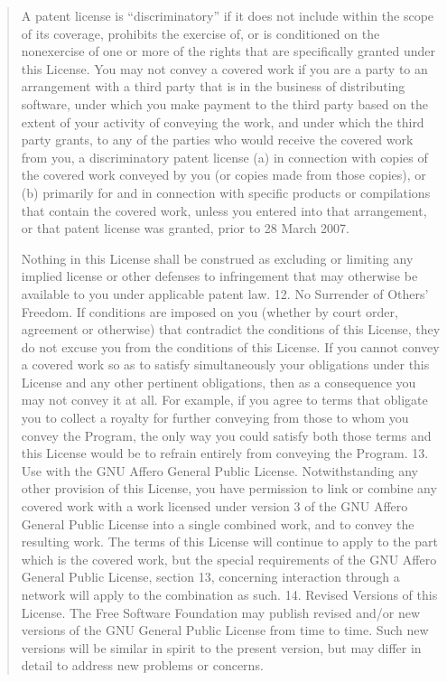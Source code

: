 \documentclass[letterpaper,10pt,english]{sphinxmanual}
\begin{document}
\begin{quote}
A patent license is “discriminatory” if it does not include within the scope of its coverage, prohibits the exercise of, or is conditioned on the non\sphinxhyphen{}exercise of one or more of the rights that are specifically granted under this License. You may not convey a covered work if you are a party to an arrangement with a third party that is in the business of distributing software, under which you make payment to the third party based on the extent of your activity of conveying the work, and under which the third party grants, to any of the parties who would receive the covered work from you, a discriminatory patent license (a) in connection with copies of the covered work conveyed by you (or copies made from those copies), or (b) primarily for and in connection with specific products or compilations that contain the covered work, unless you entered into that arrangement, or that patent license was granted, prior to 28 March 2007.

Nothing in this License shall be construed as excluding or limiting any implied license or other defenses to infringement that may otherwise be available to you under applicable patent law.
12. No Surrender of Others’ Freedom.
If conditions are imposed on you (whether by court order, agreement or otherwise) that contradict the conditions of this License, they do not excuse you from the conditions of this License. If you cannot convey a covered work so as to satisfy simultaneously your obligations under this License and any other pertinent obligations, then as a consequence you may not convey it at all. For example, if you agree to terms that obligate you to collect a royalty for further conveying from those to whom you convey the Program, the only way you could satisfy both those terms and this License would be to refrain entirely from conveying the Program.
13. Use with the GNU Affero General Public License.
Notwithstanding any other provision of this License, you have permission to link or combine any covered work with a work licensed under version 3 of the GNU Affero General Public License into a single combined work, and to convey the resulting work. The terms of this License will continue to apply to the part which is the covered work, but the special requirements of the GNU Affero General Public License, section 13, concerning interaction through a network will apply to the combination as such.
14. Revised Versions of this License.
The Free Software Foundation may publish revised and/or new versions of the GNU General Public License from time to time. Such new versions will be similar in spirit to the present version, but may differ in detail to address new problems or concerns.


\end{quote}
\end{document}
